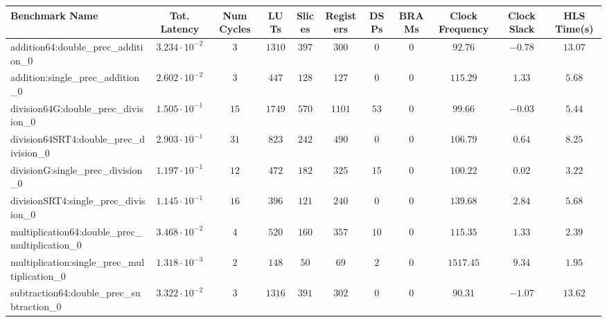 \begin{tabular}{|l|c|c|c|c|c|c|c|c|c|c|}
\hline
Benchmark Name                                   & Tot. Latency            & Num Cycles & LUTs     & Slices   & Registers & DSPs   & BRAMs & Clock Frequency & Clock Slack & HLS Time(s) \\
\hline
addition64:double\_prec\_addition\_0             & $ 3.234 \cdot 10^{-2} $ & $ 3      $ & $ 1310 $ & $ 397  $ & $ 300   $ & $ 0  $ & $ 0 $ & $ 92.76       $ & $ -0.78   $ & $ 13.07   $ \\
addition:single\_prec\_addition\_0               & $ 2.602 \cdot 10^{-2} $ & $ 3      $ & $ 447  $ & $ 128  $ & $ 127   $ & $ 0  $ & $ 0 $ & $ 115.29      $ & $ 1.33    $ & $ 5.68    $ \\
division64G:double\_prec\_division\_0            & $ 1.505 \cdot 10^{-1} $ & $ 15     $ & $ 1749 $ & $ 570  $ & $ 1101  $ & $ 53 $ & $ 0 $ & $ 99.66       $ & $ -0.03   $ & $ 5.44    $ \\
division64SRT4:double\_prec\_division\_0         & $ 2.903 \cdot 10^{-1} $ & $ 31     $ & $ 823  $ & $ 242  $ & $ 490   $ & $ 0  $ & $ 0 $ & $ 106.79      $ & $ 0.64    $ & $ 8.25    $ \\
divisionG:single\_prec\_division\_0              & $ 1.197 \cdot 10^{-1} $ & $ 12     $ & $ 472  $ & $ 182  $ & $ 325   $ & $ 15 $ & $ 0 $ & $ 100.22      $ & $ 0.02    $ & $ 3.22    $ \\
divisionSRT4:single\_prec\_division\_0           & $ 1.145 \cdot 10^{-1} $ & $ 16     $ & $ 396  $ & $ 121  $ & $ 240   $ & $ 0  $ & $ 0 $ & $ 139.68      $ & $ 2.84    $ & $ 5.68    $ \\
multiplication64:double\_prec\_multiplication\_0 & $ 3.468 \cdot 10^{-2} $ & $ 4      $ & $ 520  $ & $ 160  $ & $ 357   $ & $ 10 $ & $ 0 $ & $ 115.35      $ & $ 1.33    $ & $ 2.39    $ \\
multiplication:single\_prec\_multiplication\_0   & $ 1.318 \cdot 10^{-3} $ & $ 2      $ & $ 148  $ & $ 50   $ & $ 69    $ & $ 2  $ & $ 0 $ & $ 1517.45     $ & $ 9.34    $ & $ 1.95    $ \\
subtraction64:double\_prec\_subtraction\_0       & $ 3.322 \cdot 10^{-2} $ & $ 3      $ & $ 1316 $ & $ 391  $ & $ 302   $ & $ 0  $ & $ 0 $ & $ 90.31       $ & $ -1.07   $ & $ 13.62   $ \\

\end{tabular}
